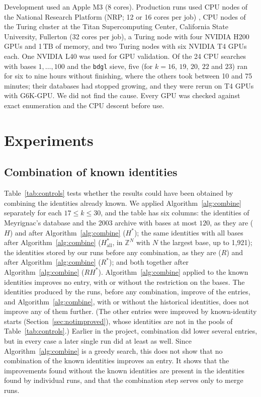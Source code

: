\documentclass[11pt]{amsart}
\theoremstyle{definition}
\theoremstyle{remark}
\newcommand{\Z}{\mathbb{Z}}
\begin{document}
Development used an Apple M3 (8 cores). Production runs used CPU nodes of the National
Research Platform (NRP; 12 or 16 cores per job) \cite{Weitzel2025NRP}, CPU nodes of the Turing
cluster at the Titan Supercomputing Center, California State University, Fullerton (32 cores
per job), a Turing node with four NVIDIA H200 GPUs and 1\,TB of memory, and two Turing nodes
with six NVIDIA T4 GPUs each. One NVIDIA L40 was used for GPU validation. Of the 24 CPU
searches with bases $1,\dots,100$ and the \texttt{bdgl} sieve, five (for $k=16$, $19$, $20$, $22$
and $23$) ran for six to nine hours without finishing, where the others took between 10 and 75
minutes; their
databases had stopped growing, and they were rerun on T4 GPUs with G6K-GPU. We did not find the
cause. Every GPU was checked against exact enumeration and the CPU descent before use.

\section{Experiments}\label{sec:experiments}

\subsection{Combination of known identities}\label{sec:controls}
Table~\ref{tab:controls} tests whether the results could have been obtained by combining the
identities already known. We applied Algorithm~\ref{alg:combine} separately for each
$17\le k\le30$, and the table has six columns: the identities of Meyrignac's database and the 2003 archive with bases at most $120$, as they are ($H$) and after
Algorithm~\ref{alg:combine} ($H^*$); the same identities with all bases after
Algorithm~\ref{alg:combine} ($H^*_{\mathrm{all}}$, in $\Z^{N}$ with $N$ the largest base, up to
1,921); the identities stored by our runs before any combination, as they are ($R$) and after
Algorithm~\ref{alg:combine} ($R^*$); and both together after Algorithm~\ref{alg:combine}
($RH^*$). Algorithm~\ref{alg:combine} applied to the known identities improves no entry, with or
without the restriction on the bases. The identities produced by the runs, before any
combination, improve \CtrlRImp{} of the \NumImproved{} entries, and Algorithm~\ref{alg:combine},
with or without the historical identities, does not improve any of them further. (The other
entries were improved by known-identity starts (Section~\ref{sec:notimproved}), whose
identities are not in the pools of Table~\ref{tab:controls}.) Earlier in the project, combination did lower several entries, but in
every case a later single run did at least as well. Since Algorithm~\ref{alg:combine} is a greedy
search, this does not show that no combination of the known identities improves an entry. It
shows that the improvements found without the known identities are present in the identities
found by individual runs, and that the combination step serves only to merge runs.
\end{document}
